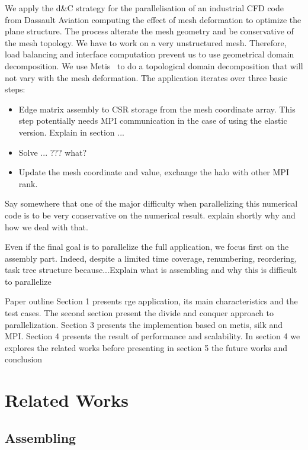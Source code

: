 \documentclass{IOS-Book-Article}
\begin{document}
We apply the d\&C strategy for the parallelisation of an industrial CFD code from Dassault Aviation computing the effect of mesh deformation to optimize the plane structure.
The process alterate the mesh geometry and be conservative of the mesh topology.  We have to work on a very unstructured mesh. Therefore, load balancing and interface
computation prevent us to use geometrical domain decomposition.
We use Metis~\cite{Metis} to do a topological domain decomposition that will not vary with the mesh deformation.
The application iterates over three basic steps:
\begin{itemize}
\item Edge matrix assembly to CSR storage from the mesh coordinate array. This step potentially needs MPI communication in the case of using the elastic version.
Explain in section ...
\item Solve ... ??? what?
\item Update the mesh coordinate and value, exchange the halo with other MPI rank.
\end{itemize}
Say somewhere that one of the major difficulty when parallelizing this numerical code is to be very conservative on the numerical result. explain shortly why and how we deal
with that.


Even if the final goal is to parallelize the full application, we focus first on the assembly part. Indeed, despite a limited time coverage, renumbering, reordering,
task tree structure because...Explain what is assembling and why this is difficult to parallelize



Paper outline
Section 1 presents rge application, its main characteristics and the test cases.
The second section present the divide and conquer approach to parallelization. 
Section 3 presents the implemention based on metis, silk and MPI.
Section 4 presents the result of performance and scalability. 
In section 4 we explores the related works before presenting in section 5 the future works and conclusion

\section{Related Works}
\subsection{Assembling}
\end{document}
